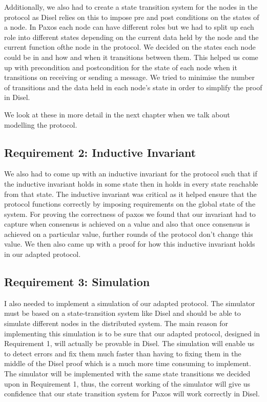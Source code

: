 Additionally, we also had to create a state transition system for the nodes in
the protocol as Disel relies on this to impose pre and post conditions on the
states of a node. In Paxos
each node can have different roles but we had to split up each role into different
states depending on the current data held by the node and the current function
ofthe node in the protocol. We decided on the states each node could be in and
how and when it transitions between them. This helped us come up with precondition
and postcondition for the state of each node when it transitions on receiving or
sending a message. We tried to minimise the number of transitions and the data
held in each node’s state in order to simplify the proof in Disel.

We look at these in more detail in the next chapter when we talk about modelling
the protocol.

\subsection{Requirement 2: Inductive Invariant}
We also had to come up with an inductive invariant for the protocol such that if
the inductive invariant holds in some state then in holds in every state reachable
from that state. The inductive invariant was critical as it helped ensure that
the protocol functions correctly by imposing requirements on the global state of
the system. For proving the correctness of paxos we found that our invariant had
to capture when consensus is achieved on a value and also that once consensus is
achieved on a particular value, further rounds of the protocol don’t change this
value. We then also came up with a proof for how this inductive invariant holds
in our adapted protocol.

\subsection{Requirement 3: Simulation}
I also needed to implement a simulation of our adapted protocol. The simulator
must be based on a state-transition system like Disel and should be able
to simulate different nodes in the distributed system. The main reason for
implementing this simulation is to be sure that our adapted protocol, designed
in Requirement 1, will actually be provable in Disel. The simulation will enable
us to detect errors and fix them much faster than having to fixing them in the
middle of the Disel proof which is a much more time consuming to implement.
The simulator will be implemented with the same state transitions we decided
upon in Requirement 1, thus, the corrent working of the simulator will give us
confidence that our state transition system for Paxos will work correctly in Disel.

